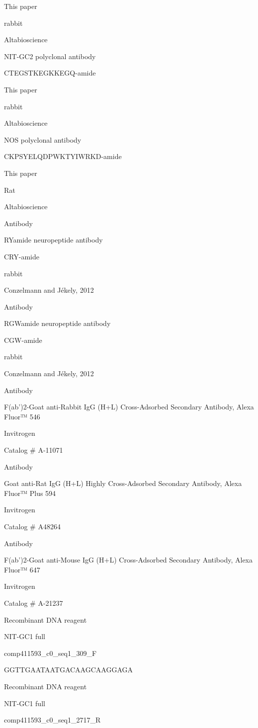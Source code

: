 \documentclass[
  10pt,
  onecolumn]{article}
\begin{document}
This paper

rabbit

Altabioscience

NIT-GC2 polyclonal antibody

CTEGSTKEGKKEGQ-amide

This paper

rabbit

Altabioscience

NOS polyclonal antibody

CKPSYELQDPWKTYIWRKD-amide

This paper

Rat

Altabioscience

Antibody

RYamide neuropeptide antibody

CRY-amide

rabbit

Conzelmann and Jékely, 2012

Antibody

RGWamide neuropeptide antibody

CGW-amide

rabbit

Conzelmann and Jékely, 2012

Antibody

F(ab')2-Goat anti-Rabbit IgG (H+L) Cross-Adsorbed Secondary Antibody,
Alexa Fluor™ 546

Invitrogen

Catalog \# A-11071

Antibody

Goat anti-Rat IgG (H+L) Highly Cross-Adsorbed Secondary Antibody, Alexa
Fluor™ Plus 594

Invitrogen

Catalog \# A48264

Antibody

F(ab')2-Goat anti-Mouse IgG (H+L) Cross-Adsorbed Secondary Antibody,
Alexa Fluor™ 647

Invitrogen

Catalog \# A-21237

Recombinant DNA reagent

NIT-GC1 full

comp411593\_c0\_seq1\_309\_F

GGTTGAATAATGACAAGCAAGGAGA

Recombinant DNA reagent

NIT-GC1 full

comp411593\_c0\_seq1\_2717\_R
\end{document}
